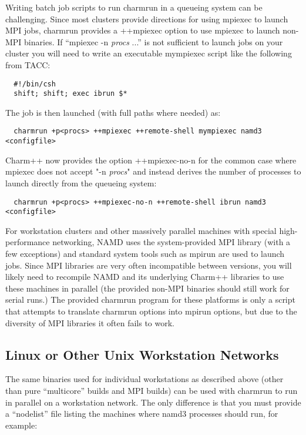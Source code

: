Writing batch job scripts to run charmrun in a queueing system can be
challenging.  Since most clusters provide directions for using mpiexec
to launch MPI jobs, charmrun provides a ++mpiexec option to use mpiexec
to launch non-MPI binaries.  If ``mpiexec -n {\em procs} ...'' is not
sufficient to launch jobs on your cluster you will need to write an
executable mympiexec script like the following from TACC:

\begin{verbatim}
  #!/bin/csh
  shift; shift; exec ibrun $*
\end{verbatim}

The job is then launched (with full paths where needed) as:

\begin{verbatim}
  charmrun +p<procs> ++mpiexec ++remote-shell mympiexec namd3 <configfile>
\end{verbatim}

Charm++ now provides the option ++mpiexec-no-n for the common case
where mpiexec does not accept "-n {\em procs}" and instead derives the
number of processes to launch directly from the queueing system:

\begin{verbatim}
  charmrun +p<procs> ++mpiexec-no-n ++remote-shell ibrun namd3 <configfile>
\end{verbatim}

For workstation clusters and other massively parallel machines with
special high-performance networking, NAMD uses the system-provided MPI
library (with a few exceptions) and standard system tools such as mpirun
are used to launch jobs.  Since MPI libraries are very often incompatible
between versions, you will likely need to recompile NAMD and its
underlying Charm++ libraries to use these machines in parallel (the
provided non-MPI binaries should still work for serial runs.) The provided
charmrun program for these platforms is only a script that attempts to
translate charmrun options into mpirun options, but due to the diversity
of MPI libraries it often fails to work.

\subsection{Linux or Other Unix Workstation Networks}

The same binaries used for individual workstations as described above
(other than pure ``multicore'' builds and MPI builds)
can be used with charmrun to run in parallel on a workstation network.
The only difference is that you must provide a ``nodelist'' file listing
the machines where namd3 processes should run, for example:


